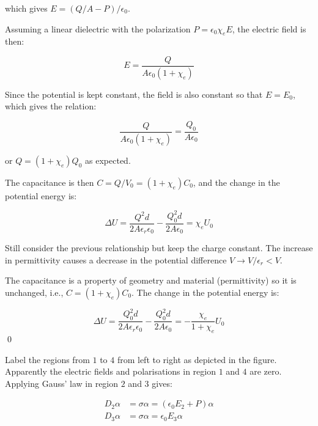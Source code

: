 \documentclass[12pt]{article}
\begin{document}
which gives $E = (Q/A - P)/\epsilon_{0}$.

Assuming a linear dielectric with the polarization $P = \epsilon_{0} \chi_{e} E$, the electric field is then:

\begin{equation}
    E = \frac{Q}{A\epsilon_{0}(1 + \chi_{e})}
\end{equation}

Since the potential is kept constant, the field is also constant so that $E = E_{0}$, which gives the relation:

\begin{equation}
    \frac{Q}{A\epsilon_{0}(1 + \chi_{e})} = \frac{Q_{0}}{A\epsilon_{0}}
\end{equation}

or $Q = (1 + \chi_{e}) Q_{0}$ as expected.

The capacitance is then $C = Q/V_{0} = (1 + \chi_{e})C_{0}$, and the change in the potential energy is:

\begin{equation}
    \Delta U = \frac{Q^{2}d}{2A\epsilon_{r}\epsilon_{0}} - \frac{Q_{0}^{2}d}{2A\epsilon_{0}} = \chi_{e} U_{0}
\end{equation}

Still consider the previous relationship but keep the charge constant. The increase in permittivity causes a decrease in the potential difference $V \to V/\epsilon_{r} < V$.

The capacitance is a property of geometry and material (permittivity) so it is unchanged, i.e., $C = (1 + \chi_{e})C_{0}$. The change in the potential energy is:

\begin{equation}
    \Delta U = \frac{Q_{0}^{2}d}{2A\epsilon_{r}\epsilon_{0}} - \frac{Q_{0}^{2}d}{2A\epsilon_{0}} = -\frac{\chi_{e}}{1 + \chi_{e}} U_{0}
\end{equation}
\qed



Label the regions from $1$ to $4$ from left to right as depicted in the figure. Apparently the electric fields and polarisations in region $1$ and $4$ are zero. Applying Gauss' law in region $2$ and $3$ gives:

\begin{equation}
\begin{split}
    D_{2} \alpha &= \sigma \alpha = (\epsilon_{0} E_{2} + P) \alpha \\
    D_{3} \alpha &= \sigma \alpha = \epsilon_{0} E_{3} \alpha
\end{split}
\end{equation}
\end{document}
